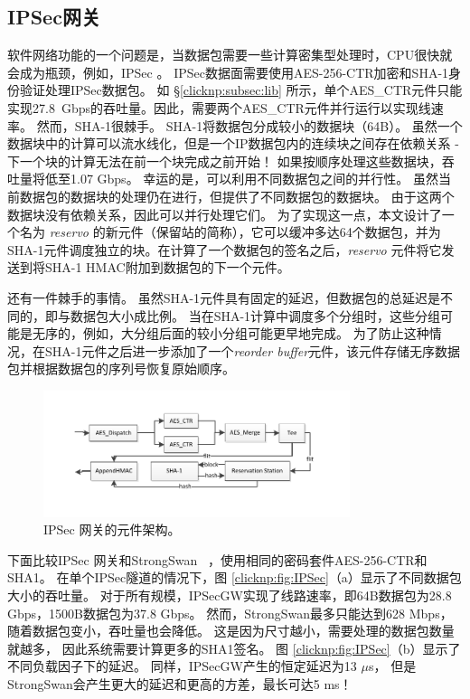\subsection{IPSec网关}
软件网络功能的一个问题是，当数据包需要一些计算密集型处理时，CPU很快就会成为瓶颈，例如，IPSec \cite {packetshader}。
IPSec数据面需要使用AES-256-CTR加密和SHA-1身份验证处理IPSec数据包。
如 \S \ref {clicknp:subsec:lib} 所示，单个AES\_CTR元件只能实现27.8~Gbps的吞吐量。因此，需要两个AES\_CTR元件并行运行以实现线速率。
然而，SHA-1很棘手。 SHA-1将数据包分成较小的数据块（64B）。
虽然一个数据块中的计算可以流水线化，但是一个IP数据包内的连续块之间存在依赖关系 - 下一个块的计算无法在前一个块完成之前开始！
如果按顺序处理这些数据块，吞吐量将低至1.07 Gbps。
幸运的是，可以利用不同数据包之间的并行性。
虽然当前数据包的数据块的处理仍在进行，但提供了不同数据包的数据块。
由于这两个数据块没有依赖关系，因此可以并行处理它们。
为了实现这一点，本文设计了一个名为 \textit {reservo} 的新元件（保留站的简称），它可以缓冲多达64个数据包，并为SHA-1元件调度独立的块。在计算了一个数据包的签名之后，\textit {reservo} 元件将它发送到将SHA-1 HMAC附加到数据包的下一个元件。

还有一件棘手的事情。
虽然SHA-1元件具有固定的延迟，但数据包的总延迟是不同的，即与数据包大小成比例。
当在SHA-1计算中调度多个分组时，这些分组可能是无序的，例如，大分组后面的较小分组可能更早地完成。
为了防止这种情况，在SHA-1元件之后进一步添加了一个\textit {reorder buffer}元件，该元件存储无序数据包并根据数据包的序列号恢复原始顺序。


\begin{figure}[htbp]
	\centering
	\includegraphics[width=0.8\textwidth]{image/IPSec}
	\caption{IPSec 网关的元件架构。}
	\label{clicknp:fig:IPSec-arch}
\end{figure}


下面比较IPSec 网关和StrongSwan~ \cite {strongswan}，使用相同的密码套件AES-256-CTR和SHA1。
在单个IPSec隧道的情况下，图 \ref {clicknp:fig:IPSec}（a）显示了不同数据包大小的吞吐量。
对于所有规模，IPSecGW实现了线路速率，即64B数据包为28.8 Gbps，1500B数据包为37.8 Gbps。
然而，StrongSwan最多只能达到628 Mbps，随着数据包变小，吞吐量也会降低。
这是因为尺寸越小，需要处理的数据包数量就越多，
因此系统需要计算更多的SHA1签名。
图 \ref {clicknp:fig:IPSec}（b）显示了不同负载因子下的延迟。 同样，IPSecGW产生的恒定延迟为13 $\mu$s，
但是StrongSwan会产生更大的延迟和更高的方差，最长可达5 ms！



